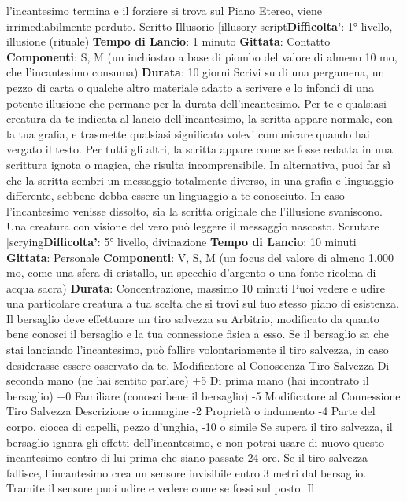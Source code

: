 \begin{multicols}{2}
l’incantesimo termina e il forziere si trova sul Piano
Etereo, viene irrimediabilmente perduto.
Scritto Illusorio
[illusory script\textbf{Difficolta'}:
1° livello, illusione (rituale)
\textbf{Tempo di Lancio}: 1 minuto
\textbf{Gittata}: Contatto
\textbf{Componenti}: S, M (un inchiostro a base di piombo del
valore di almeno 10 mo, che l’incantesimo consuma)
\textbf{Durata}: 10 giorni
Scrivi su di una pergamena, un pezzo di carta o
qualche altro materiale adatto a scrivere e lo infondi di
una potente illusione che permane per la durata
dell’incantesimo.
Per te e qualsiasi creatura da te indicata al lancio
dell’incantesimo, la scritta appare normale, con la tua
grafia, e trasmette qualsiasi significato volevi
comunicare quando hai vergato il testo. Per tutti gli altri,
la scritta appare come se fosse redatta in una scrittura
ignota o magica, che risulta incomprensibile. In
alternativa, puoi far sì che la scritta sembri un
messaggio totalmente diverso, in una grafia e
linguaggio differente, sebbene debba essere un
linguaggio a te conosciuto.
In caso l’incantesimo venisse dissolto, sia la scritta
originale che l’illusione svaniscono.
Una creatura con visione del vero può leggere il
messaggio nascosto.
Scrutare
[scrying\textbf{Difficolta'}:
5° livello, divinazione
\textbf{Tempo di Lancio}: 10 minuti
\textbf{Gittata}: Personale
\textbf{Componenti}: V, S, M (un focus del valore di almeno
1.000 mo, come una sfera di cristallo, un specchio
d’argento o una fonte ricolma di acqua sacra)
\textbf{Durata}: Concentrazione, massimo 10 minuti
Puoi vedere e udire una particolare creatura a tua
scelta che si trovi sul tuo stesso piano di esistenza. Il
bersaglio deve effettuare un tiro salvezza su Arbitrio,
modificato da quanto bene conosci il bersaglio e la tua
connessione fisica a esso. Se il bersaglio sa che stai
lanciando l’incantesimo, può fallire volontariamente il
tiro salvezza, in caso desiderasse essere osservato da
te.
Modificatore al
Conoscenza Tiro Salvezza
Di seconda mano (ne hai sentito parlare) +5
Di prima mano (hai incontrato il bersaglio) +0
Familiare (conosci bene il bersaglio) -5
Modificatore al
Connessione Tiro Salvezza
Descrizione o immagine -2
Proprietà o indumento -4
Parte del corpo, ciocca di capelli, pezzo d’unghia, -10
o simile
Se supera il tiro salvezza, il bersaglio ignora gli effetti
dell’incantesimo, e non potrai usare di nuovo questo
incantesimo contro di lui prima che siano passate 24
ore.
Se il tiro salvezza fallisce, l’incantesimo crea un
sensore invisibile entro 3 metri dal bersaglio. Tramite il
sensore puoi udire e vedere come se fossi sul posto. Il

\end{multicols}
